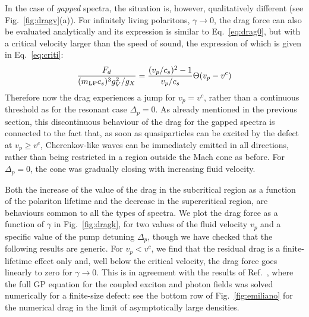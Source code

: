 In the case of \emph{gapped} spectra, the situation is, however,
qualitatively different (see Fig.~\ref{fig:dragv}(a)). For infinitely
living polaritons, $\gamma \to 0$, the drag force can also be
evaluated analytically and its expression is similar to
Eq.~\eqref{eq:drag0}, but with a critical velocity larger than the
speed of sound, the expression of which is given in
Eq.~\eqref{eq:criti}:
%
\begin{equation}
  \frac{F_d}{(m_{\text{LP}}c_s)^3 g_V^2/g_X}=\frac{(v_p/c_s)^2 - 1}{v_p/c_s}
  \Theta(v_p - v^c)
\end{equation}
%
Therefore now the drag experiences a jump for $v_p=v^c$, rather than a
continuous threshold as for the resonant case $\Delta_p=0$. As already
mentioned in the previous section, this discontinuous behaviour of the
drag for the gapped spectra is connected to the fact that, as soon as
quasiparticles can be excited by the defect at $v_p\ge v^c$,
Cherenkov-like waves can be immediately emitted in all directions,
rather than being restricted in a region outside the Mach cone as
before. For $\Delta_p=0$, the cone was gradually closing with
increasing  fluid velocity.

Both the increase of the value of the drag in the subcritical region
as a function of the polariton lifetime and the decrease in the
supercritical region, are behaviours common to all the types of
spectra. We plot the drag force as a function of $\gamma$ in
Fig.~\ref{fig:dragk}, for two values of the fluid velocity $v_p$ and a
specific value of the pump detuning $\Delta_p$, though we have checked
that the following results are generic. For $v_p < v^c$, we find that
the residual drag is a finite-lifetime effect only and, well below the
critical velocity, the drag force goes linearly to zero for
$\gamma \to 0$. This is in agreement with the results of
Ref.~\cite{Cancellieri_2010}, where the full GP equation for the
coupled exciton and photon fields was solved numerically for a
finite-size defect: see the bottom row of Fig.~\ref{fig:emiliano} for
the numerical drag in the limit of asymptotically large densities.

